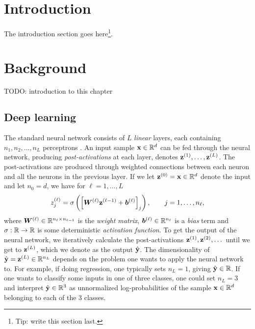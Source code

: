 \documentclass{statsmsc}
\begin{document}
{%
\mainmatter


\chapter{Introduction} %

The introduction section goes here\footnote{Tip: write this section last.}.


\chapter{Background} %

TODO: introduction to this chapter

\section{Deep learning}%
\label{sec:Deep learning}

The standard neural network consists of $L$ \textit{linear} layers, each containing
$n_1,n_2,\dots,n_L$ perceptrons \citep{dnn}. An input sample $\mathbf{x} \in \mathbb{R}^d$ can be fed
through the neural network, producing \textit{post-activations} at each layer, denotes
$\mathbf{z}^{(1)}, \dots, \mathbf{z}^{(L)}$. The post-activations are produced through weighted
connections between each neuron and all the neurons in the previous layer. If we let
$\mathbf{z}^{(0)}=\mathbf{x} \in \mathbb{R}^d$ denote the input and let $n_0=d$, we have for $\ell=1,\dots,L$
\begin{equation}\label{eq:nn_update}
    z_j^{(\ell)} = \sigma \left(\left[ \boldsymbol{W}^{(\ell)} \mathbf{z}^{(\ell-1)} + \boldsymbol{b}^{(\ell)} \right]_j \right),\qquad j=1,\dots,n_\ell,
\end{equation}
where $\boldsymbol{W}^{(\ell)} \in \mathbb{R}^{n_{\ell} \times n_{\ell-1}}$ is the \textit{weight matrix},
$\boldsymbol{b}^{(\ell)} \in \mathbb{R}^{n_{\ell}}$ is a \textit{bias} term and
$\sigma : \mathbb{R} \rightarrow {\mathbb{R}}$ is some deterministic \textit{activation function}.
To get the output of the neural network, we iteratively calculate the post-activations
$\mathbf{z}^{(1)},\mathbf{z}^{(2)},\dots$ until we get to $\mathbf{z}^{(L)}$, which we denote as the output
$\hat{\mathbf{y}}$. The dimensionality of $\hat{\mathbf{y}}=\mathbf{z}^{(L)} \in \mathbb{R}^{n_L}$
depends on the problem one wants
to apply the neural network to. For example, if doing regression, one typically sets
$n_L=1$, giving $\hat{\mathbf{y}} \in \mathbb{R}$. If one wants to classify some inputs in one of three classes,
one could set $n_L=3$ and interpret $\hat{\mathbf{y}} \in \mathbb{R}^3$ as unnormalized log-probabilities of
the sample $\mathbf{x} \in \mathbb{R}^d$ belonging to each of the 3 classes.

}
\end{document}
